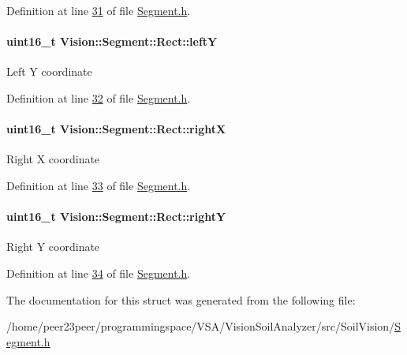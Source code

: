 Definition at line \hyperlink{_segment_8h_source_l00031}{31} of file \hyperlink{_segment_8h_source}{Segment.\+h}.

\hypertarget{struct_vision_1_1_segment_1_1_rect_ac6d22f96862077f159abc7e1accc20ab}{}
\paragraph[{left\+Y}]{\setlength{\rightskip}{0pt plus 5cm}uint16\+\_\+t Vision\+::\+Segment\+::\+Rect\+::left\+Y}\label{struct_vision_1_1_segment_1_1_rect_ac6d22f96862077f159abc7e1accc20ab}
Left Y coordinate 

Definition at line \hyperlink{_segment_8h_source_l00032}{32} of file \hyperlink{_segment_8h_source}{Segment.\+h}.

\hypertarget{struct_vision_1_1_segment_1_1_rect_a6de0dfefe6b8360ee4d57027d1fba928}{}
\paragraph[{right\+X}]{\setlength{\rightskip}{0pt plus 5cm}uint16\+\_\+t Vision\+::\+Segment\+::\+Rect\+::right\+X}\label{struct_vision_1_1_segment_1_1_rect_a6de0dfefe6b8360ee4d57027d1fba928}
Right X coordinate 

Definition at line \hyperlink{_segment_8h_source_l00033}{33} of file \hyperlink{_segment_8h_source}{Segment.\+h}.

\hypertarget{struct_vision_1_1_segment_1_1_rect_ab1a913248c715c25362c478498246983}{}
\paragraph[{right\+Y}]{\setlength{\rightskip}{0pt plus 5cm}uint16\+\_\+t Vision\+::\+Segment\+::\+Rect\+::right\+Y}\label{struct_vision_1_1_segment_1_1_rect_ab1a913248c715c25362c478498246983}
Right Y coordinate 

Definition at line \hyperlink{_segment_8h_source_l00034}{34} of file \hyperlink{_segment_8h_source}{Segment.\+h}.



The documentation for this struct was generated from the following file\+:\begin{DoxyCompactItemize}
\item 
/home/peer23peer/programmingspace/\+V\+S\+A/\+Vision\+Soil\+Analyzer/src/\+Soil\+Vision/\hyperlink{_segment_8h}{Segment.\+h}\end{DoxyCompactItemize}

